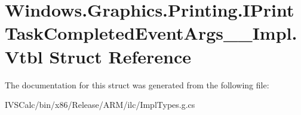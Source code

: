 \hypertarget{struct_windows_1_1_graphics_1_1_printing_1_1_i_print_task_completed_event_args_____impl_1_1_vtbl}{}\section{Windows.\+Graphics.\+Printing.\+I\+Print\+Task\+Completed\+Event\+Args\+\_\+\+\_\+\+Impl.\+Vtbl Struct Reference}
\label{struct_windows_1_1_graphics_1_1_printing_1_1_i_print_task_completed_event_args_____impl_1_1_vtbl}


The documentation for this struct was generated from the following file\+:\begin{DoxyCompactItemize}
\item 
I\+V\+S\+Calc/bin/x86/\+Release/\+A\+R\+M/ilc/Impl\+Types.\+g.\+cs\end{DoxyCompactItemize}
